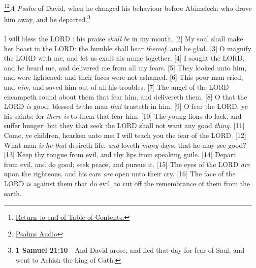 \footnote{\textcolor[cmyk]{0.99998,1,0,0}{\hyperlink{TOC}{Return to end of Table of Contents.}}}\footnote{\href{https://www.audioverse.org/english/audiobibles/books/ENGKJV/O/Ps/1}{\textcolor[cmyk]{0.99998,1,0,0}{Psalms Audio}}}\textcolor[cmyk]{0.99998,1,0,0}{\emph{A Psalm} of David, when he changed his behaviour before Abimelech; who drove him away, and he departed.}\footnote{\textbf{1 Samuel 21:10} - And David arose, and fled that day for fear of Saul, and went to Achish the king of Gath.}\\
\\
\textcolor[cmyk]{0.99998,1,0,0}{I will bless the LORD : his praise \emph{shall}  \emph{be} in my mouth.}
[2] \textcolor[cmyk]{0.99998,1,0,0}{My soul shall make her boast in the LORD: the humble shall hear \emph{thereof}, and be glad.}
[3] \textcolor[cmyk]{0.99998,1,0,0}{O magnify the LORD with me, and let us exalt his name together.}
[4] \textcolor[cmyk]{0.99998,1,0,0}{I sought the LORD, and he heard me, and delivered me from all my fears.}
[5] \textcolor[cmyk]{0.99998,1,0,0}{They looked unto him, and were lightened: and their faces were not ashamed.}
[6] \textcolor[cmyk]{0.99998,1,0,0}{This poor man cried, and  \emph{him}, and saved him out of all his troubles.}
[7] \textcolor[cmyk]{0.99998,1,0,0}{The angel of the LORD encampeth round about them that fear him, and delivereth them.}
[8] \textcolor[cmyk]{0.99998,1,0,0}{O  that the LORD \emph{is} good: blessed \emph{is} the man \emph{that} trusteth in him.}
[9] \textcolor[cmyk]{0.99998,1,0,0}{O fear the LORD, ye his saints: for \emph{there} \emph{is}  to them that fear him.}
[10] \textcolor[cmyk]{0.99998,1,0,0}{The young lions do lack, and suffer hunger: but they that seek the LORD shall not want any good \emph{thing}.}
[11] \textcolor[cmyk]{0.99998,1,0,0}{Come, ye children, hearken unto me: I will teach you the fear of the LORD.}
[12] \textcolor[cmyk]{0.99998,1,0,0}{What man \emph{is} \emph{he} \emph{that} desireth life, \emph{and} loveth \emph{many} days, that he may see good?}
[13] \textcolor[cmyk]{0.99998,1,0,0}{Keep thy tongue from evil, and thy lips from speaking guile.}
[14] \textcolor[cmyk]{0.99998,1,0,0}{Depart from evil, and do good; seek peace, and pursue it.}
[15] \textcolor[cmyk]{0.99998,1,0,0}{The eyes of the LORD \emph{are} upon the righteous, and his ears \emph{are} {open} unto their cry.}
[16] \textcolor[cmyk]{0.99998,1,0,0}{The face of the LORD \emph{is} against them that do evil, to cut off the remembrance of them from the earth.}

